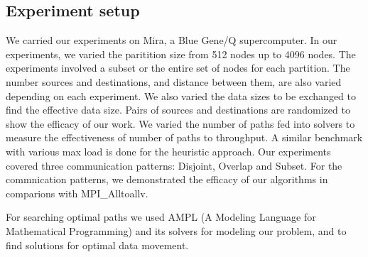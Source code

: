 \subsection{Experiment setup}

We carried our experiments on Mira, a Blue Gene/Q supercomputer. In our experiments, we varied the paritition size from 512 nodes up to 4096 nodes. The experiments involved a subset or the entire set of nodes for each partition. The number sources and destinations, and distance between them, are also varied depending on each experiment. We also varied the data sizes to be exchanged to find the effective data size. Pairs of sources and destinations are randomized to show the efficacy of our work. We varied the number of paths fed into solvers to measure the effectiveness of number of paths to throughput. A similar benchmark with various max load is done for the heuristic approach. Our experiments covered three communication patterns: Disjoint, Overlap and Subset. For the commnication patterns, we demonstrated the efficacy of our algorithms in comparions with MPI\_Alltoallv.

For searching optimal paths we used AMPL (A Modeling Language for Mathematical Programming) and its solvers \cite{AMPL} for modeling our problem, and to find solutions for optimal data movement.
